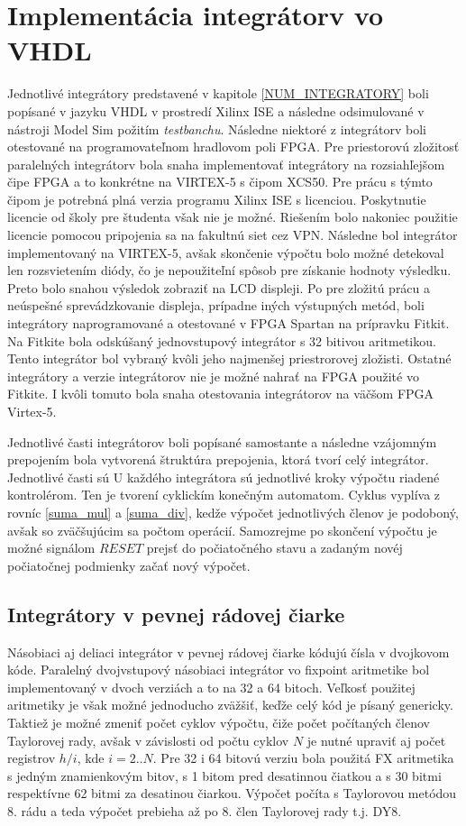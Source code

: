 \chapter{Implementácia integrátorv vo VHDL}
Jednotlivé integrátory predstavené v kapitole \ref{NUM_INTEGRATORY} boli popísané v jazyku VHDL v prostredí Xilinx ISE a následne odsimulované v nástroji Model Sim požitím \textit{testbanchu}. Následne niektoré z integrátorv boli otestované na programovateľnom hradlovom poli FPGA.
Pre priestorovú zložitosť paralelných integrátorv bola snaha implementovať integrátory na rozsiahľejšom čipe FPGA a to konkrétne na VIRTEX-5 s čipom XCS50. Pre prácu s týmto čipom je potrebná plná verzia programu Xilinx ISE s licenciou. Poskytnutie licencie od školy pre študenta však nie je možné. Riešením bolo nakoniec použitie licencie pomocou pripojenia sa na fakultnú siet cez VPN. Následne bol integrátor implementovaný na VIRTEX-5, avšak skončenie výpočtu bolo možné detekoval len rozsvietením diódy, čo je nepoužiteľní spôsob pre získanie hodnoty výsledku. Preto bolo snahou výsledok zobraziť na LCD displeji. Po 
pre zložitú prácu a neúspešné sprevádzkovanie displeja, prípadne iných výstupných metód, boli integrátory naprogramované a otestované v FPGA Spartan na prípravku Fitkit. Na Fitkite bola odskúšaný jednovstupový integrátor s 32 bitivou aritmetikou. Tento integrátor bol vybraný kvôli jeho najmenšej priestrorovej zložisti. Ostatné integrátory a verzie integrátorov nie je možné nahrať na FPGA použité vo Fitkite. I kvôli tomuto bola snaha otestovania integrátorov na väčšom FPGA Virtex-5.

Jednotlivé časti integrátorov boli popísané samostante a následne vzájomným prepojením bola vytvorená štruktúra prepojenia, ktorá tvorí celý integrátor. Jednotlivé časti sú  U každého integrátora sú jednotlivé kroky výpočtu riadené kontrolérom. Ten je tvorení cyklickím konečným automatom. Cyklus vyplíva z rovníc \eqref{suma_mul} a \eqref{suma_div}, kedže výpočet jednotlivých členov je podoboný, avšak so zväčšujúcim sa počtom operácií. Samozrejme po skončení výpočtu je možné signálom $ RESET $ prejsť do počiatočného stavu a zadaným novéj počiatočnej podmienky začať nový výpočet.

\section{Integrátory v pevnej rádovej čiarke}
Násobiaci aj deliaci integrátor v pevnej rádovej čiarke kódujú čísla v dvojkovom kóde.
Paralelný dvojvstupový násobiaci integrátor vo fixpoint aritmetike bol implementovaný v dvoch verziách a to na 32 a 64 bitoch. Veľkosť použitej aritmetiky je však možné jednoducho zväžšiť, keďže celý kód je písaný genericky. Taktiež je možné zmeniť počet cyklov výpočtu, čiže počet počítaných členov Taylorovej rady, avšak v závislosti od počtu cyklov $ N $ je nutné upraviť aj počet registrov $ h/i $, kde $ i = 2..N $. 
Pre 32 i 64 bitovú verziu bola použitá FX aritmetika s jedným znamienkovým bitov, s 1 bitom pred desatinnou čiatkou a s 30 bitmi respektívne 62 bitmi za desatinou čiarkou. Výpočet počíta s Taylorovou metódou 8. rádu a teda výpočet prebieha až po 8. člen Taylorovej rady t.j. DY8.


